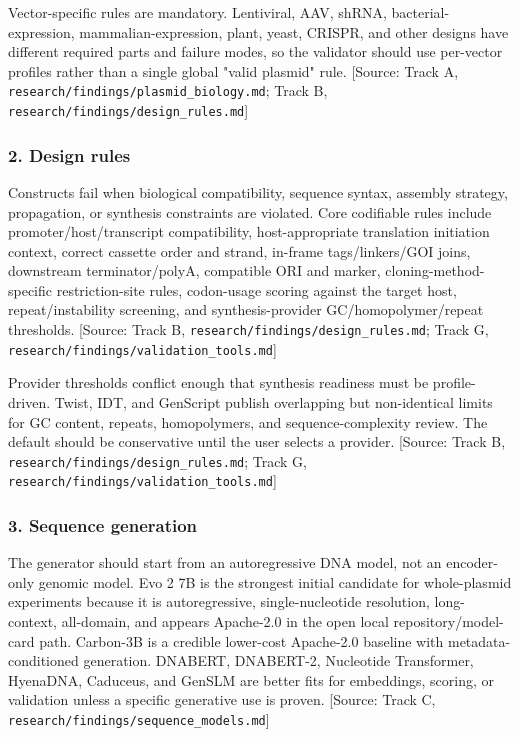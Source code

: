 \documentclass[11pt]{report}
\begin{document}
Vector-specific rules are mandatory. Lentiviral, AAV, shRNA, bacterial-expression, mammalian-expression, plant, yeast, CRISPR, and other designs have different required parts and failure modes, so the validator should use per-vector profiles rather than a single global "valid plasmid" rule. [Source: Track A, \texttt{research/findings/plasmid\_biology.md}; Track B, \texttt{research/findings/design\_rules.md}]\par

\subsubsection{2. Design rules}

Constructs fail when biological compatibility, sequence syntax, assembly strategy, propagation, or synthesis constraints are violated. Core codifiable rules include promoter/host/transcript compatibility, host-appropriate translation initiation context, correct cassette order and strand, in-frame tags/linkers/GOI joins, downstream terminator/polyA, compatible ORI and marker, cloning-method-specific restriction-site rules, codon-usage scoring against the target host, repeat/instability screening, and synthesis-provider GC/homopolymer/repeat thresholds. [Source: Track B, \texttt{research/findings/design\_rules.md}; Track G, \texttt{research/findings/validation\_tools.md}]\par

Provider thresholds conflict enough that synthesis readiness must be profile-driven. Twist, IDT, and GenScript publish overlapping but non-identical limits for GC content, repeats, homopolymers, and sequence-complexity review. The default should be conservative until the user selects a provider. [Source: Track B, \texttt{research/findings/design\_rules.md}; Track G, \texttt{research/findings/validation\_tools.md}]\par

\subsubsection{3. Sequence generation}

The generator should start from an autoregressive DNA model, not an encoder-only genomic model. Evo 2 7B is the strongest initial candidate for whole-plasmid experiments because it is autoregressive, single-nucleotide resolution, long-context, all-domain, and appears Apache-2.0 in the open local repository/model-card path. Carbon-3B is a credible lower-cost Apache-2.0 baseline with metadata-conditioned generation. DNABERT, DNABERT-2, Nucleotide Transformer, HyenaDNA, Caduceus, and GenSLM are better fits for embeddings, scoring, or validation unless a specific generative use is proven. [Source: Track C, \texttt{research/findings/sequence\_models.md}]\par
\end{document}

